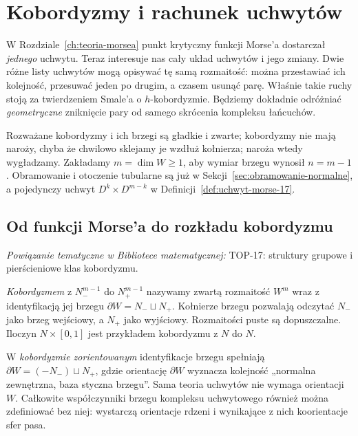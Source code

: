 \chapter{Kobordyzmy i rachunek uchwytów}
\label{ch:rachunek-uchwytow}

\providecommand{\atlasref}[2]{#2}

W Rozdziale~\ref{ch:teoria-morsea} punkt krytyczny
funkcji Morse'a dostarczał \emph{jednego} uchwytu.
Teraz interesuje nas cały układ uchwytów i jego
zmiany. Dwie różne listy uchwytów mogą opisywać tę
samą rozmaitość: można przestawiać ich kolejność,
przesuwać jeden po drugim, a czasem usunąć parę.
Właśnie takie ruchy stoją za twierdzeniem Smale'a
o $h$-kobordyzmie. Będziemy dokładnie odróżniać
\emph{geometryczne} zniknięcie pary od samego
skrócenia kompleksu łańcuchów.

Rozważane kobordyzmy i ich brzegi są gładkie i zwarte;
kobordyzmy nie mają naroży, chyba że chwilowo sklejamy je
wzdłuż kołnierza; naroża wtedy wygładzamy.
Zakładamy $m=\dim W\geq1$, aby wymiar brzegu wynosił
$n=m-1$. Obramowanie i otoczenie tubularne są już
w Sekcji~\ref{sec:obramowanie-normalne}, a pojedynczy
uchwyt $D^k\times D^{m-k}$ w
Definicji~\ref{def:uchwyt-morse-17}.

\section{Od funkcji Morse'a do rozkładu kobordyzmu}
\label{sec:kobordyzm-18}

\noindent\emph{Powiązanie tematyczne w Bibliotece matematycznej:} \atlasref{TOP-17::prop:bordism-group-v9}{TOP-17: struktury grupowe i pierścieniowe klas kobordyzmu}.

\begin{definicja}[Kobordyzm]
\label{def:kobordyzm-18}
\emph{Kobordyzmem} z $N_-^{m-1}$ do
$N_+^{m-1}$ nazywamy zwartą rozmaitość $W^m$
wraz z identyfikacją jej brzegu
$\partial W=N_-\sqcup N_+$.
Kołnierze brzegu pozwalają odczytać $N_-$
jako brzeg wejściowy, a $N_+$ jako wyjściowy.
Rozmaitości puste są dopuszczalne. Iloczyn
$N\times[0,1]$ jest przykładem kobordyzmu
z $N$ do $N$.
\end{definicja}

W \emph{kobordyzmie zorientowanym} identyfikacje brzegu
spełniają $\partial W=(-N_-)\sqcup N_+$,
gdzie orientację $\partial W$ wyznacza kolejność
„normalna zewnętrzna, baza styczna brzegu”.
Sama teoria uchwytów nie wymaga orientacji $W$.
Całkowite współczynniki brzegu kompleksu uchwytowego
również można zdefiniować bez niej: wystarczą orientacje
rdzeni i wynikające z nich koorientacje sfer pasa.

